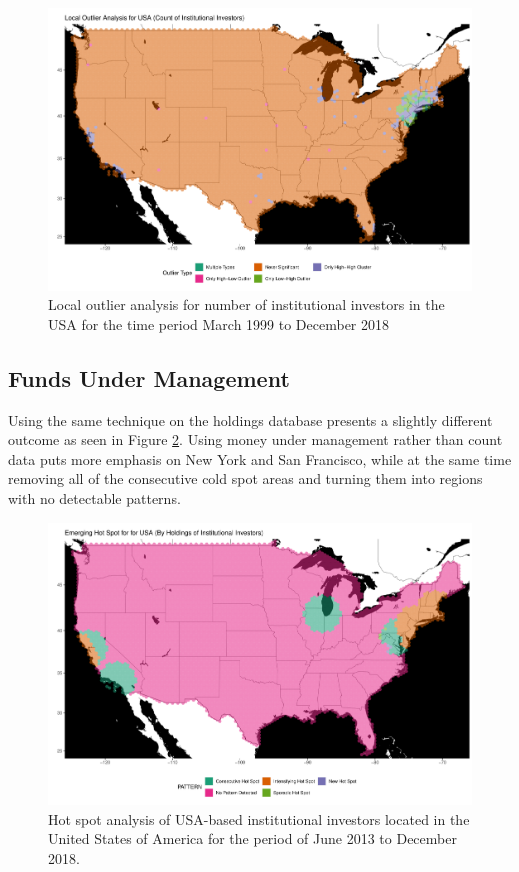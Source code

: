 \begin{figure}
	\centering
	\includegraphics[width=1\linewidth]{Figures/ChapterIV/USA_Count_LO}
	\caption[Local Outlier Analysis for Number of Institutional Investors in the USA 1999-2018]{Local outlier analysis for number of institutional investors in the USA for the time period March 1999 to December 2018}
	\label{fig:usaloacount}
\end{figure}

\subsection{Funds Under Management}

Using the same technique on the holdings database presents a slightly different  outcome as seen in Figure \ref{fig:usaHSP_Money}. Using money under management rather than count data puts more emphasis on New York and San Francisco, while at the same time removing all of the consecutive cold spot areas and turning them into regions with no detectable patterns.  	

\begin{figure}
	\centering
	\includegraphics[width=1\linewidth]{Figures/ChapterIV/USA_Money_EH}
	\caption[Hot Spot Analysis of USA-based Institutional Investors 2013-2018]{Hot spot analysis of USA-based institutional investors located in the United States of America for the period of June 2013 to December 2018. }
	\label{fig:usaHSP_Money}
\end{figure}	


